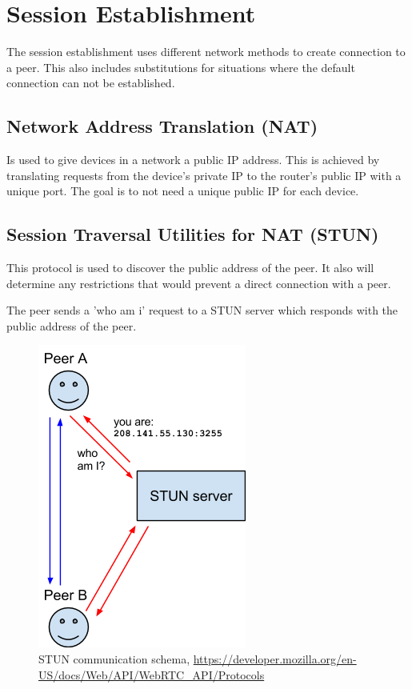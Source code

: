
\section{Session Establishment}
The session establishment uses different network methods to create connection to a peer. This also includes substitutions for situations where the default connection can not be established.

\subsection{Network Address Translation (NAT)}
Is used to give devices in a network a public IP address. This is achieved by translating requests from the device's private IP to the router's public IP with a unique port. The goal is to not need a unique public IP for each device.

\subsection{Session Traversal Utilities for NAT (STUN)}
This protocol is used to discover the public address of the peer. It also will determine any restrictions that would prevent a direct connection with a peer.

The peer sends a 'who am i' request to a STUN server which responds with the public address of the peer.

\begin{figure}[H]
	\includegraphics[scale=0.5]{images/webrtc-stun.png}
	\centering
	\caption{STUN communication schema, \url{https://developer.mozilla.org/en-US/docs/Web/API/WebRTC_API/Protocols}}
	\label{fig:STUN}
\end{figure}

